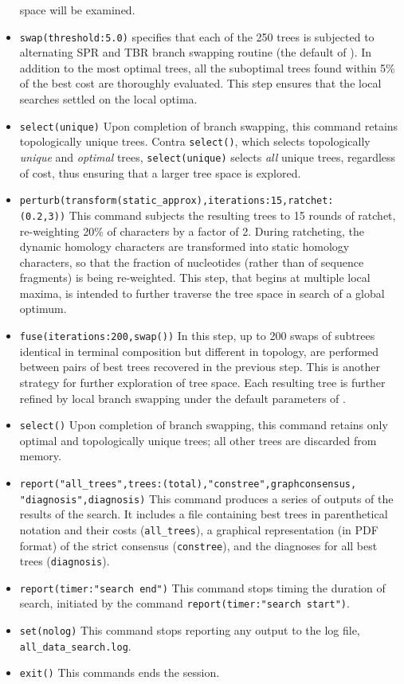 \begin{itemize}
space will be examined.
\item \texttt{swap(threshold:5.0)}  specifies that each of the 250 trees is subjected to 
alternating SPR and TBR branch swapping routine (the default of \poy). In addition to the most optimal trees, 
all the suboptimal trees found within 5\% of the best cost are thoroughly evaluated. This step ensures that 
the local searches settled on the local optima.
\item \texttt{select(unique)} Upon completion of branch swapping, this command retains topologically unique trees.
Contra \texttt{select()}, which selects topologically \emph{unique} and \emph{optimal} trees,  \texttt{select(unique)} 
selects \emph{all} unique trees, regardless of cost, thus ensuring that a larger tree space is explored.
\item \texttt{perturb(transform(static\_approx),iterations:15,ratchet:\\(0.2,3))} This command subjects the 
resulting trees to 15 rounds of ratchet, re-weighting 20\% of characters by a factor of 2. During ratcheting, 
the dynamic homology characters are transformed into static homology characters, so that the fraction of 
nucleotides (rather than of sequence fragments) is being re-weighted. This step, that begins at multiple 
local maxima, is intended to further traverse the tree space in search of a global optimum.
\item \texttt{fuse(iterations:200,swap())} In this step, up to 200 swaps of subtrees identical in terminal 
composition but different in topology, are performed between pairs of best trees recovered in the previous 
step. This is another strategy for further exploration of tree space. Each resulting tree is further refined by 
local branch swapping under the default parameters of .
\item \texttt{select()} Upon completion of branch swapping, this command retains only optimal and 
topologically unique trees; all other trees are discarded from memory.
\item \texttt{report("all\_trees",trees:(total),"constree",graphconsensus,\\"diagnosis",diagnosis)} This command 
produces a series of outputs of the results of the search. It includes a file containing best trees in parenthetical 
notation and their costs (\texttt{all\_trees}), a graphical representation (in PDF format) of the strict consensus 
(\texttt{constree}), and the diagnoses for all best trees (\texttt{diagnosis}).
\item \texttt{report(timer:"search end")} This command stops timing the duration of search, initiated by the 
command \texttt{report(timer:"search start")}.
\item \texttt{set(nolog)} This command stops reporting any output to the log file, \texttt{all\_data\_search.log}.
\item \texttt{exit()} This commands ends the \poy session.
\end{itemize}

